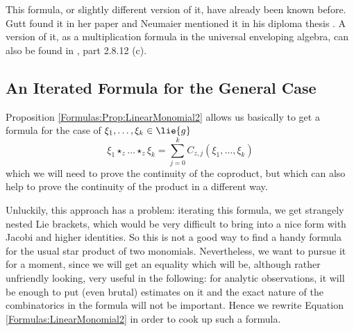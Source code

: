 \begin{remark}
	\label{Formulas:Rem:EasierFormulaAlreadyKnown}
	This formula, or slightly different version of it, have already been known 
	before. Gutt found it in her paper \cite{gutt:1983a} and Neumaier 
	mentioned it in his diploma thesis \cite{neumaier:1998c}. A version of it, 
	as a multiplication formula in the universal enveloping algebra, can also 
	be found in \cite{dixmier:1974a}, part 2.8.12 (c).
\end{remark}



%
\subsection{An Iterated Formula for the General Case}

Proposition \ref{Formulas:Prop:LinearMonomial2} allows us basically 
to get a formula for the case of $\xi_1, \ldots, \xi_k \in \lie{g}$
\begin{equation*}
	\xi_1 \star_z \ldots \star_z \xi_k
	=
	\sum\limits_{j=0}^k
	C_{z,j} \left(
		\xi_1, \ldots, \xi_k
	\right)
\end{equation*}
which we will need to prove the continuity of the coproduct, but which 
can also help to prove the continuity of the product in a different way.

Unluckily, this approach has a problem: iterating this formula, we get 
strangely nested Lie brackets, which would be very difficult to bring 
into a nice form with Jacobi and higher identities. So this is not a 
good way to find a handy formula for the usual star product of two 
monomials. Nevertheless, we want to pursue it for a moment, since we 
will get an equality which will be, although rather unfriendly looking, 
very useful in the following: for analytic observations, it will be 
enough to put (even brutal) estimates on it and the exact nature of the 
combinatorics in the formula will not be important. Hence we rewrite 
Equation \eqref{Formulas:LinearMonomial2} in order to cook up such a 
formula.

